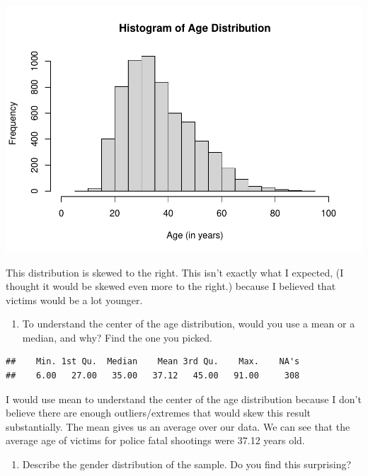 \documentclass[
]{article}
\newenvironment{Shaded}{\begin{snugshade}}{\end{snugshade}}
\newcommand{\FunctionTok}[1]{\textcolor[rgb]{0.00,0.00,0.00}{#1}}
\newcommand{\NormalTok}[1]{#1}
\newcommand{\SpecialCharTok}[1]{\textcolor[rgb]{0.00,0.00,0.00}{#1}}
\providecommand{\tightlist}{%
  \setlength{\itemsep}{0pt}\setlength{\parskip}{0pt}}
\begin{document}
\includegraphics{Journal_files/figure-latex/unnamed-chunk-23-1.pdf}

This distribution is skewed to the right. This isn't exactly what I
expected, (I thought it would be skewed even more to the right.) because
I believed that victims would be a lot younger.

\begin{enumerate}
\def\labelenumi{\alph{enumi}.}
\setcounter{enumi}{1}
\tightlist
\item
  To understand the center of the age distribution, would you use a mean
  or a median, and why? Find the one you picked.
\end{enumerate}

\begin{Shaded}
\end{Shaded}

\begin{verbatim}
##    Min. 1st Qu.  Median    Mean 3rd Qu.    Max.    NA's 
##    6.00   27.00   35.00   37.12   45.00   91.00     308
\end{verbatim}

I would use mean to understand the center of the age distribution
because I don't believe there are enough outliers/extremes that would
skew this result substantially. The mean gives us an average over our
data. We can see that the average age of victims for police fatal
shootings were 37.12 years old.

\begin{enumerate}
\def\labelenumi{\alph{enumi}.}
\setcounter{enumi}{2}
\tightlist
\item
  Describe the gender distribution of the sample. Do you find this
  surprising?
\end{enumerate}
\end{document}
